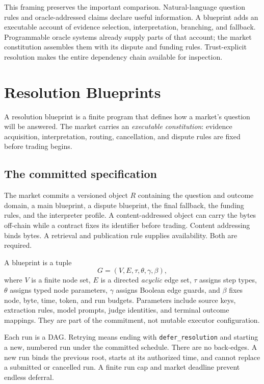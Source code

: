 \documentclass[10pt]{article}
\begin{document}
This framing preserves the important comparison. Natural-language question rules and oracle-addressed claims declare useful information. A blueprint adds an executable account of evidence selection, interpretation, branching, and fallback. Programmable oracle systems already supply parts of that account; the market constitution assembles them with its dispute and funding rules. Trust-explicit resolution makes the entire dependency chain available for inspection.

\section{Resolution Blueprints}
\label{sec:blueprints}

A resolution blueprint is a finite program that defines how a market's question will be answered. The market carries an \emph{executable constitution}: evidence acquisition, interpretation, routing, cancellation, and dispute rules are fixed before trading begins.

\subsection{The committed specification}

The market commits a versioned object $R$ containing the question and outcome domain, a main blueprint, a dispute blueprint, the final fallback, the funding rules, and the interpreter profile. A content-addressed object can carry the bytes off-chain while a contract fixes its identifier before trading. Content addressing binds bytes. A retrieval and publication rule supplies availability. Both are required.

A blueprint is a tuple
\[
G=(V,E,\tau,\theta,\gamma,\beta),
\]
where $V$ is a finite node set, $E$ is a directed \emph{acyclic} edge set, $\tau$ assigns step types, $\theta$ assigns typed node parameters, $\gamma$ assigns Boolean edge guards, and $\beta$ fixes node, byte, time, token, and run budgets. Parameters include source keys, extraction rules, model prompts, judge identities, and terminal outcome mappings. They are part of the commitment, not mutable executor configuration.

Each run is a DAG. Retrying means ending with \texttt{defer\_resolution} and starting a new, numbered run under the committed schedule. There are no back-edges. A new run binds the previous root, starts at its authorized time, and cannot replace a submitted or cancelled run. A finite run cap and market deadline prevent endless deferral.
\end{document}

